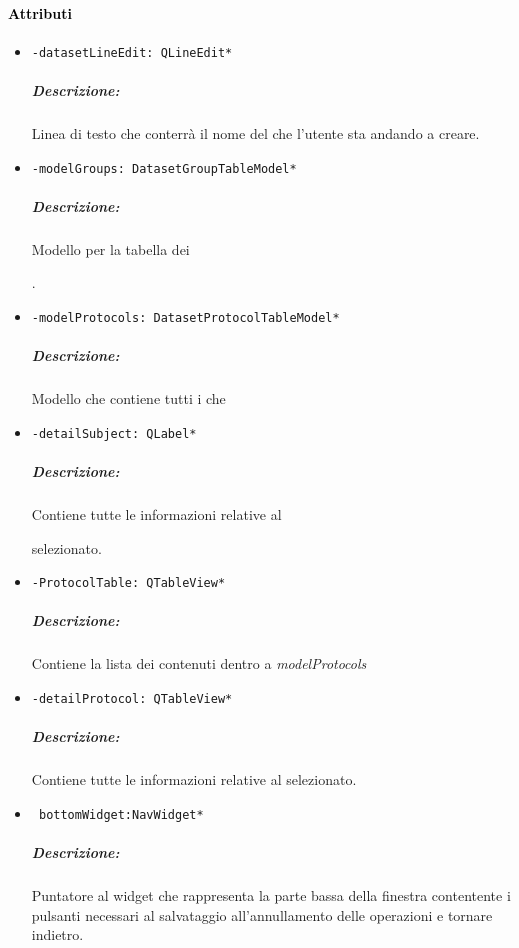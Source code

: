 \paragraph{\textcolor{black}{Attributi\\}}
\begin{itemize}
\item\color{teal}\verb!-datasetLineEdit: QLineEdit*!
\color{black}
\subparagraph{Descrizione:}Linea di testo che conterrà il nome del \dataset{} che l'utente sta andando a creare.
 
\item\color{teal}\verb!-modelGroups: DatasetGroupTableModel*!
\color{black}
\subparagraph{Descrizione:}Modello per la tabella dei \subject{}.
 
\item\color{teal}\verb!-modelProtocols: DatasetProtocolTableModel*!
\color{black}
\subparagraph{Descrizione:}Modello che contiene tutti i \protocol{} che
 
\item\color{teal}\verb!-detailSubject: QLabel*!
\color{black}
\subparagraph{Descrizione:}Contiene tutte le informazioni relative al \subject{} selezionato.
 
\item\color{teal}\verb!-ProtocolTable: QTableView*!
\color{black}
\subparagraph{Descrizione:}Contiene la lista dei \protocol{} contenuti dentro a \emph{modelProtocols}
 
\item\color{teal}\verb!-detailProtocol: QTableView*!
\color{black}
\subparagraph{Descrizione:}Contiene tutte le informazioni relative al \protocol{} selezionato.
 
\item\color{teal}\verb! bottomWidget:NavWidget*!
\color{black} 
 \subparagraph{Descrizione:}
Puntatore al widget che rappresenta la parte bassa della finestra contentente i pulsanti necessari al salvataggio all'annullamento delle operazioni e tornare indietro.
 \end{itemize}
